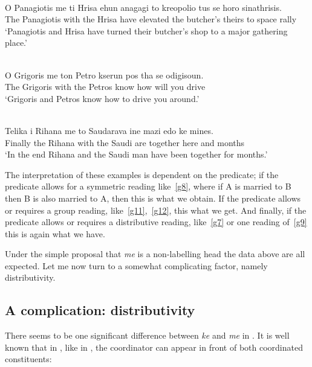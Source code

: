 \documentclass[output=paper]{langsci/langscibook}
\begin{document}
\ea\label{ex:key:29.37} \\
	\gll    O Panagiotis me ti Hrisa ehun anagagi to kreopolio tus se horo
    sinathrisis.\\
            The Panagiotis with the Hrisa have elevated the butcher's theirs to space rally\\ \label{g11}
    \glt    \enquote*{Panagiotis and Hrisa have turned their butcher's shop to
    a major gathering place.}
\z

\ea\label{ex:key:29.38} \\
	\gll    O Grigoris me ton Petro kserun pos tha se odigisoun.\\
            The Grigoris with the Petros know how will you drive\\ \label{g12}
    \glt    \enquote*{Grigoris and Petros know how to drive you around.}
\z

\ea\label{ex:key:29.39} \\
	\gll    Telika i Rihana me to Saudarava ine mazi edo ke mines.\\
            Finally the Rihana with the Saudi are together here and months\\ \label{g13}
    \glt    \enquote*{In the end Rihana and the Saudi man have been together
    for months.}
\z

The interpretation of these examples is dependent on the predicate; if the
predicate allows for a symmetric reading like~\eqref{g8}, where if A is married
to B then B is also married to A, then this is what we obtain. If the predicate
allows or requires a group reading, like~\eqref{g11},~\eqref{g12}, this what we
get. And finally, if the predicate allows or requires a distributive reading,
like~\eqref{g7} or one reading of~\eqref{g9} this is again what we have.

Under the simple proposal that \emph{me} is a non-labelling head the data above
are all expected. Let me now turn to a somewhat complicating factor, namely
distributivity.

\subsection{A complication: distributivity} \label{distro}

There seems to be one significant difference between \emph{ke} and \emph{me} in
. It is well known that in , like in , the
coordinator can appear in front of both coordinated constituents:
\end{document}
